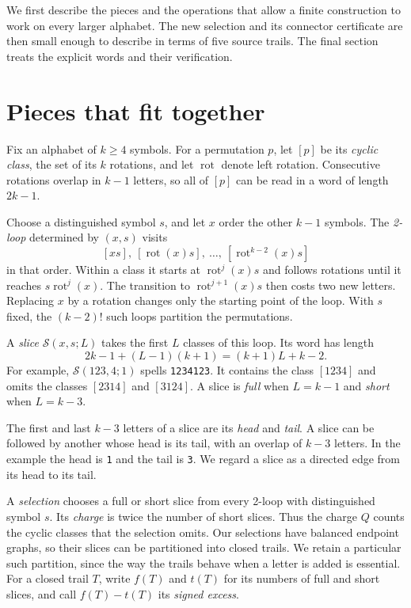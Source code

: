 \documentclass[11pt]{article}
\newcommand{\Slice}{\mathcal S}
\newcommand{\word}[1]{\texttt{#1}}
\DeclareMathOperator{\rot}{rot}
\begin{document}
We first describe the pieces and the operations that allow a finite
construction to work on every larger alphabet. The new selection and
its connector certificate are then small enough to describe in terms of
five source trails. The final section treats the explicit words and their
verification.

\section{Pieces that fit together}\label{sec-pieces}

Fix an alphabet of $k\ge4$ symbols. For a permutation $p$, let $[p]$ be its
\emph{cyclic class}, the set of its $k$ rotations, and let $\rot$ denote
left rotation. Consecutive rotations overlap in $k-1$ letters, so all of
$[p]$ can be read in a word of length $2k-1$.

Choose a distinguished symbol $s$, and let $x$ order the other $k-1$
symbols. The \emph{2-loop} determined by $(x,s)$ visits
\[
 [xs],\ [\rot(x)s],\ \ldots,\ [\rot^{k-2}(x)s]
\]
in that order. Within a class it starts at $\rot^j(x)s$ and follows
rotations until it reaches $s\rot^j(x)$. The transition to
$\rot^{j+1}(x)s$ then costs two new letters. Replacing $x$ by a rotation
changes only the starting point of the loop. With $s$ fixed, the
$(k-2)!$ such loops partition the permutations.

A \emph{slice} $\Slice(x,s;L)$ takes the first $L$ classes of this loop.
Its word has length
\[
 2k-1+(L-1)(k+1)=(k+1)L+k-2.
\]
For example, $\Slice(123,4;1)$ spells \word{1234123}. It contains the
class $[1234]$ and omits the classes $[2314]$ and $[3124]$. A slice is
\emph{full} when $L=k-1$ and \emph{short} when $L=k-3$.

The first and last $k-3$ letters of a slice are its \emph{head} and
\emph{tail}. A slice can be followed by another whose head is its tail,
with an overlap of $k-3$ letters. In the example the head is \word{1}
and the tail is \word{3}. We regard a slice as a directed edge from its
head to its tail.

A \emph{selection} chooses a full or short slice from every 2-loop with
distinguished symbol $s$. Its \emph{charge} is twice the number of short
slices. Thus the charge $Q$ counts the cyclic classes that the selection
omits. Our selections have balanced endpoint graphs, so their slices can
be partitioned into closed trails. We retain a particular such partition,
since the way the trails behave when a letter is added is essential.
For a closed trail $T$, write $f(T)$ and $t(T)$ for its numbers of full
and short slices, and call $f(T)-t(T)$ its \emph{signed excess}.
\end{document}
